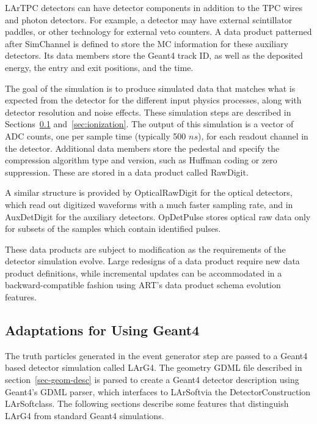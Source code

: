 \documentclass[12pt]{elsarticle}
\newcommand{\larsoft}{LArSoft}
\begin{document}
LArTPC detectors can have detector components in addition to the TPC wires and photon detectors.
For example, a detector may have external scintillator paddles, or other technology for external veto
counters.   A data product patterned after SimChannel is defined to store the MC information
for these auxiliary detectors.  Its data members store the Geant4 track ID, as well as the deposited energy, the entry and exit positions, and the time.

The goal of the simulation is to produce simulated data that matches what is expected from the detector for
the different input physics processes, along with detector resolution and noise effects.  These simulation
steps are described in Sections~\ref{sec:adapt} and~\ref{sec:ionization}. The output of this simulation is a vector of ADC counts,
one per sample time (typically 500 $ns$), for each readout channel in the detector.  Additional data members
store the pedestal and specify the compression algorithm type and version, such as Huffman coding or zero 
suppression. These are stored in a data product called RawDigit.

A similar structure is provided by OpticalRawDigit for the optical detectors, which read out
digitized waveforms with a much faster sampling rate, and in
AuxDetDigit for the auxiliary detectors.  OpDetPulse stores optical raw data only for 
subsets of the samples which contain identified pulses.

These data products are subject to modification as the requirements of the detector simulation evolve.
Large redesigns of a data product require new data product definitions, while
incremental updates can be accommodated in a backward-compatible fashion using ART's
data product schema evolution features.

\subsection{Adaptations for Using Geant4}
\label{sec:adapt}

The truth particles generated in the event generator step are passed to a Geant4 
based detector simulation called LArG4.  The geometry GDML file 
described in section~\ref{sec-geom-desc} is parsed to create a Geant4 detector description using
Geant4's GDML parser, which interfaces to \larsoft via the DetectorConstruction \larsoft class.
The following sections describe some features that distinguish
LArG4 from standard Geant4 simulations.
\end{document}
